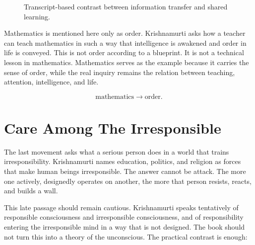 \documentclass[11pt,oneside]{book}
\begin{document}
\begin{figure}
\centering
{}

Transcript-based contrast between information transfer and shared learning.
\end{figure}

Mathematics is mentioned here only as order. Krishnamurti asks how a teacher can teach mathematics in such a way that intelligence is awakened and order in life is conveyed. This is not order according to a blueprint. It is not a technical lesson in mathematics. Mathematics serves as the example because it carries the sense of order, while the real inquiry remains the relation between teaching, attention, intelligence, and life.

\begin{equation}
\text{mathematics}
\longrightarrow
\text{order}.
\end{equation}

\section{Care Among The Irresponsible}

The last movement asks what a serious person does in a world that trains irresponsibility. Krishnamurti names education, politics, and religion as forces that make human beings irresponsible. The answer cannot be attack. The more one actively, designedly operates on another, the more that person resists, reacts, and builds a wall.

This late passage should remain cautious. Krishnamurti speaks tentatively of responsible consciousness and irresponsible consciousness, and of responsibility entering the irresponsible mind in a way that is not designed. The book should not turn this into a theory of the unconscious. The practical contrast is enough:
\end{document}
